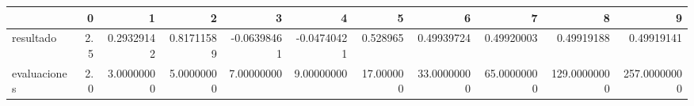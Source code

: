 \begin{tabular}{lrrrrrrrrrr}
\toprule
{} &    0 &           1 &           2 &           3 &           4 &          5 &            6 &            7 &             8 &             9 \\
\midrule
resultado    &  2.5 &  0.29329142 &  0.81711589 & -0.06398461 & -0.04740421 &   0.528965 &   0.49939724 &   0.49920003 &    0.49919188 &    0.49919141 \\
evaluaciones &  2.0 &  3.00000000 &  5.00000000 &  7.00000000 &  9.00000000 &  17.000000 &  33.00000000 &  65.00000000 &  129.00000000 &  257.00000000 \\
\bottomrule
\end{tabular}

